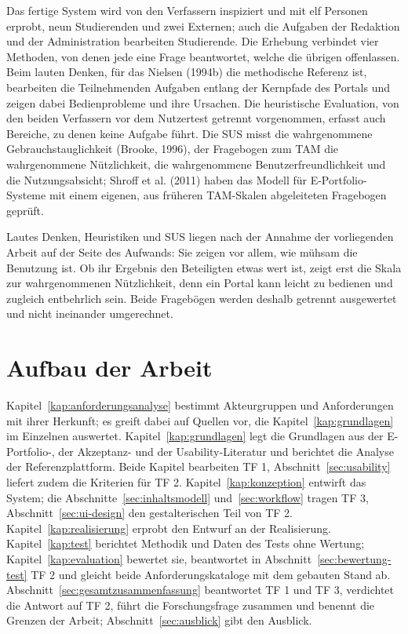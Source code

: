 Das fertige System wird von den Verfassern inspiziert und mit elf Personen erprobt, neun Studierenden und zwei Externen; auch die Aufgaben der Redaktion und der Administration bearbeiten Studierende. Die Erhebung verbindet vier Methoden, von denen jede eine Frage beantwortet, welche die übrigen offenlassen. Beim lauten Denken, für das Nielsen (1994b) die methodische Referenz ist, bearbeiten die Teilnehmenden Aufgaben entlang der Kernpfade des Portals und zeigen dabei Bedienprobleme und ihre Ursachen. Die heuristische Evaluation, von den beiden Verfassern vor dem Nutzertest getrennt vorgenommen, erfasst auch Bereiche, zu denen keine Aufgabe führt. Die SUS misst die wahrgenommene Gebrauchstauglichkeit (Brooke, 1996), der Fragebogen zum TAM die wahrgenommene Nützlichkeit, die wahrgenommene Benutzerfreundlichkeit und die Nutzungsabsicht; Shroff et al. (2011) haben das Modell für E-Portfolio-Systeme mit einem eigenen, aus früheren TAM-Skalen abgeleiteten Fragebogen geprüft.

Lautes Denken, Heuristiken und SUS liegen nach der Annahme der vorliegenden Arbeit auf der Seite des Aufwands: Sie zeigen vor allem, wie mühsam die Benutzung ist. Ob ihr Ergebnis den Beteiligten etwas wert ist, zeigt erst die Skala zur wahrgenommenen Nützlichkeit, denn ein Portal kann leicht zu bedienen und zugleich entbehrlich sein. Beide Fragebögen werden deshalb getrennt ausgewertet und nicht ineinander umgerechnet.

\section{Aufbau der Arbeit}
\label{sec:aufbau}

Kapitel~\ref{kap:anforderungsanalyse} bestimmt Akteurgruppen und Anforderungen mit ihrer Herkunft; es greift dabei auf Quellen vor, die Kapitel~\ref{kap:grundlagen} im Einzelnen auswertet. Kapitel~\ref{kap:grundlagen} legt die Grundlagen aus der E-Portfolio-, der Akzeptanz- und der Usability-Literatur und berichtet die Analyse der Referenzplattform. Beide Kapitel bearbeiten TF 1, Abschnitt~\ref{sec:usability} liefert zudem die Kriterien für TF 2. Kapitel~\ref{kap:konzeption} entwirft das System; die Abschnitte~\ref{sec:inhaltsmodell} und~\ref{sec:workflow} tragen TF 3, Abschnitt~\ref{sec:ui-design} den gestalterischen Teil von TF 2. Kapitel~\ref{kap:realisierung} erprobt den Entwurf an der Realisierung. Kapitel~\ref{kap:test} berichtet Methodik und Daten des Tests ohne Wertung; Kapitel~\ref{kap:evaluation} bewertet sie, beantwortet in Abschnitt~\ref{sec:bewertung-test} TF 2 und gleicht beide Anforderungskataloge mit dem gebauten Stand ab. Abschnitt~\ref{sec:gesamtzusammenfassung} beantwortet TF 1 und TF 3, verdichtet die Antwort auf TF 2, führt die Forschungsfrage zusammen und benennt die Grenzen der Arbeit; Abschnitt~\ref{sec:ausblick} gibt den Ausblick.
